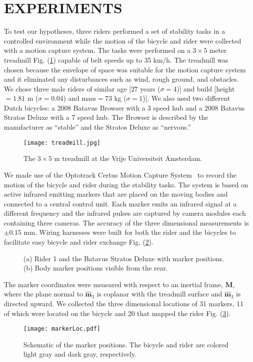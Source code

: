 \section{EXPERIMENTS}
\label{sec:exp}
To test our hypotheses, three riders performed a set of stability tasks in a controlled environment while the motion of the bicycle and rider were collected with a motion capture system. The tasks were performed on a $3\times5$ meter treadmill Fig. (\ref{fig:treadmill}) capable of belt speeds up to 35 km/h. The treadmill was chosen because the envelope of space was suitable for the motion capture system and it eliminated any disturbances such as wind, rough ground, and obstacles.  We chose three male riders of similar age [$27$ years ($\sigma=4$)] and build [height$=1.81$ m ($\sigma=0.04$) and mass$=73$ kg ($\sigma=1$)]. We also used two different Dutch bicycles: a 2008 Batavus Browser with a 3 speed hub and a 2008 Batavus Stratos Deluxe with a 7 speed hub. The Browser is described by the manufacturer as ``stable'' and the Stratos Deluxe as ``nervous.''
\begin{figure}
    \centering
        \texttt{[image: treadmill.jpg]}
    \caption{The $3\times5$ m treadmill at the Vrije Universiteit Amsterdam.}
    \label{fig:treadmill}
\end{figure}

We made use of the Optotrack Certus Motion Capture System~\cite{NorthernDigitalIncorporated2009} to record the motion of the bicycle and rider during the stability tasks. The system is based on active infrared emitting markers that are placed on the moving bodies and connected to a central control unit. Each marker emits an infrared signal at a different frequency and the infrared pulses are captured by camera modules each containing three cameras. The accuracy of the three dimensional measurements is $\pm0.15$ mm. Wiring harnesses were built for both the rider and the bicycles to facilitate easy bicycle and rider exchange Fig. (\ref{fig:markers}).
\begin{figure}
    \centering
    \caption{(a) Rider 1 and the Batavus Stratos Deluxe with marker positions. (b) Body marker positions visible from the rear.}
    \label{fig:markers}
\end{figure}

The marker coordinates were measured with respect to an inertial frame, $\mathbf{M}$, where the plane normal to $\hat{\mathbf{m}}_3$ is coplanar with the treadmill surface and $\hat{\mathbf{m}}_3$ is directed upward. We collected the three dimensional locations of 31 markers, 11 of which were located on the bicycle and 20 that mapped the rider Fig. (\ref{fig:markerloc}).
\begin{figure}
    \centering
        \texttt{[image: markerLoc.pdf]}
    \caption{Schematic of the marker positions. The bicycle and rider are colored light gray and dark gray, respectively.}
    \label{fig:markerloc}
\end{figure}

